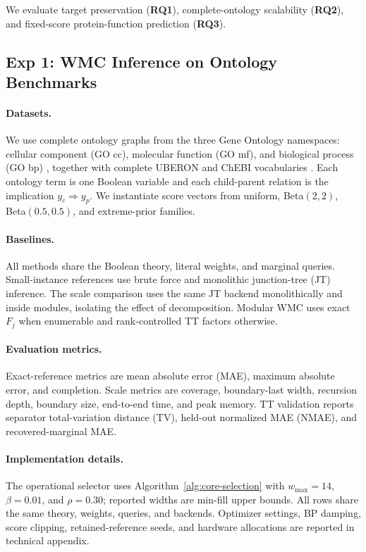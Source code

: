 \documentclass[letterpaper]{article}
\newif\ifincludesupplement
\newcommand{\suppref}[1]{\ifincludesupplement Appendix~\csname ref\endcsname{#1}\else technical appendix\fi}
\begin{document}
We evaluate target preservation (\textbf{RQ1}), complete-ontology
scalability (\textbf{RQ2}), and fixed-score protein-function prediction
(\textbf{RQ3}).

\subsection{Exp 1: WMC Inference on Ontology Benchmarks}

\paragraph{Datasets.}
We use complete ontology graphs from the three Gene Ontology namespaces:
cellular component (GO cc), molecular function (GO mf), and biological
process (GO bp) \citep{ashburner2000go,geneontology2023}, together with
complete UBERON and ChEBI vocabularies
\citep{mungall2012uberon,hastings2016chebi}. Each ontology term is
one Boolean variable and each child-parent relation is the implication
\(y_c \Rightarrow y_p\). We instantiate score vectors from
uniform, Beta\((2,2)\), Beta\((0.5,0.5)\), and extreme-prior families.

\paragraph{Baselines.}
All methods share the Boolean theory, literal weights, and marginal
queries. Small-instance references use brute force and monolithic
junction-tree (JT) inference. The scale comparison uses the same JT
backend monolithically and inside modules, isolating the effect of
decomposition. Modular WMC uses exact \(F_j\) when enumerable and
rank-controlled TT factors otherwise.

\paragraph{Evaluation metrics.}
Exact-reference metrics are mean absolute error (MAE), maximum
absolute error, and completion. Scale metrics are coverage,
boundary-last width, recursion depth, boundary size, end-to-end
time, and peak memory. TT validation reports separator
total-variation distance (TV), held-out normalized MAE (NMAE),
and recovered-marginal MAE.

\paragraph{Implementation details.}
The operational selector uses Algorithm~\ref{alg:core-selection} with
\(w_{\max}=14\), \(\beta=0.01\), and \(\rho=0.30\); reported widths are
min-fill upper bounds. All rows share the same theory, weights, queries,
and backends. Optimizer settings, BP damping, score clipping,
retained-reference seeds, and hardware allocations are reported in
\suppref{app:reproducibility}.
\end{document}
